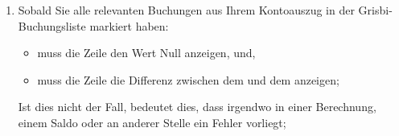 \begin{enumerate}
	\item Sobald Sie alle relevanten Buchungen aus Ihrem Kontoauszug in der Grisbi-Buchungsliste markiert haben:
	\begin{itemize}
		\item muss die Zeile  den Wert Null anzeigen, und,
		\item muss die Zeile  die Differenz zwischen dem  und dem  anzeigen;
	\end{itemize}
	Ist dies nicht der Fall, bedeutet dies, dass irgendwo in einer Berechnung, einem Saldo oder an anderer Stelle ein Fehler vorliegt;

\end{enumerate}
